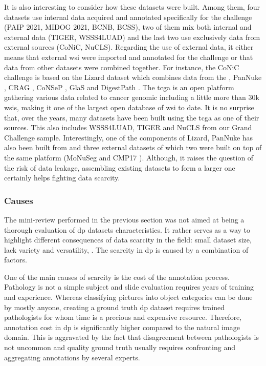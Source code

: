 It is also interesting to consider how these datasets were built. Among them, four datasets use internal data acquired and annotated specifically for the challenge (PAIP 2021, MIDOG 2021, BCNB, BCSS), two of them mix both internal and external data (TIGER, WSSS4LUAD) and the last two use exclusively data from external sources (CoNiC, NuCLS). Regarding the use of external data, it either means that external \acrshort{wsi} were imported and annotated for the challenge or that data from other datasets were combined together. For instance, the CoNiC challenge is based on the Lizard dataset \parencite{graham2021lizard} which combines data from the  \parencite{weinstein2013cancer}, PanNuke \parencite{gamper2019pannuke}, CRAG \parencite{graham2019mild}, CoNSeP \parencite{graham2019hover}, GlaS \parencite{sirinukunwattana2017gland} and DigestPath \parencite{li2019signet}. The \acrshort{tcga} is an open platform gathering various data related to cancer genomic including a little more than 30k \acrlong{wsi}s, making it one of the largest open database of \acrshort{wsi} to date. It is no surprise that, over the years, many datasets have been built using the \acrshort{tcga} as one of their sources. This also includes WSSS4LUAD, TIGER and NuCLS from our Grand Challenge sample. Interestingly, one of the components of Lizard, PanNuke has also been built from  and three external datasets of which two were built on top of the same platform (MoNuSeg \parencite{kumar2019multi} and CMP17 \parencite{vu2019methods}). Although, it raises the question of the risk of data leakage, assembling existing datasets to form a larger one certainly helps fighting data scarcity.     

\subsubsection{Causes}
\label{sssec:backdp:ds-causes}

The mini-review performed in the previous section was not aimed at being a thorough evaluation of \acrshort{dp} datasets characteristics. It rather serves as a way to highlight different consequences of data scarcity in the field: small dataset size, lack variety and versatility, \etc. The scarcity in \acrlong{dp} is caused by a combination of factors.  

One of the main causes of scarcity is the cost of the annotation process. Pathology is not a simple subject and slide evaluation requires years of training and experience. Whereas classifying pictures into object categories can be done by mostly anyone, creating a ground truth \acrlong{dp} dataset requires trained pathologists for whom time is a precious and expensive resource. Therefore, annotation cost in \acrlong{dp} is significantly higher compared to the natural image domain. This is aggravated by the fact that disagreement between pathologists is not uncommon and quality ground truth usually requires confronting and aggregating annotations by several experts. 

